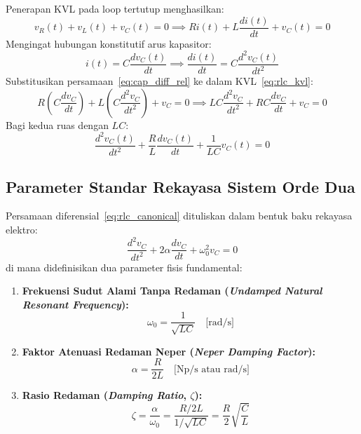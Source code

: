 \documentclass[11pt,a4paper]{article}
\theoremstyle{definition}
\begin{document}
Penerapan KVL pada loop tertutup menghasilkan:
\begin{equation}
    v_R(t) + v_L(t) + v_C(t) = 0 \implies R i(t) + L \frac{di(t)}{dt} + v_C(t) = 0
    \label{eq:rlc_kvl}
\end{equation}
Mengingat hubungan konstitutif arus kapasitor:
\begin{equation}
    i(t) = C \frac{dv_C(t)}{dt} \implies \frac{di(t)}{dt} = C \frac{d^2v_C(t)}{dt^2}
    \label{eq:cap_diff_rel}
\end{equation}
Substitusikan persamaan~\eqref{eq:cap_diff_rel} ke dalam KVL~\eqref{eq:rlc_kvl}:
\begin{equation}
    R \left( C \frac{dv_C}{dt} \right) + L \left( C \frac{d^2v_C}{dt^2} \right) + v_C = 0 \implies L C \frac{d^2v_C}{dt^2} + R C \frac{dv_C}{dt} + v_C = 0
\end{equation}
Bagi kedua ruas dengan $LC$:
\begin{equation}
    \frac{d^2v_C(t)}{dt^2} + \frac{R}{L} \frac{dv_C(t)}{dt} + \frac{1}{LC} v_C(t) = 0
    \label{eq:rlc_canonical}
\end{equation}

\subsection{Parameter Standar Rekayasa Sistem Orde Dua}

Persamaan diferensial~\eqref{eq:rlc_canonical} dituliskan dalam bentuk baku rekayasa elektro:
\begin{equation}
    \frac{d^2v_C}{dt^2} + 2\alpha \frac{dv_C}{dt} + \omega_0^2 v_C = 0
    \label{eq:rlc_standard_eng}
\end{equation}
di mana didefinisikan dua parameter fisis fundamental:
\begin{enumerate}[leftmargin=*]
    \item \textbf{Frekuensi Sudut Alami Tanpa Redaman (\textit{Undamped Natural Resonant Frequency}):}
    \begin{equation}
        \omega_0 = \frac{1}{\sqrt{LC}} \quad \text{[rad/s]}
        \label{eq:omega_zero}
    \end{equation}
    \item \textbf{Faktor Atenuasi Redaman Neper (\textit{Neper Damping Factor}):}
    \begin{equation}
        \alpha = \frac{R}{2L} \quad \text{[Np/s atau rad/s]}
        \label{eq:alpha_rlc}
    \end{equation}
    \item \textbf{Rasio Redaman (\textit{Damping Ratio}, $\zeta$):}
    \begin{equation}
        \zeta = \frac{\alpha}{\omega_0} = \frac{R/2L}{1/\sqrt{LC}} = \frac{R}{2} \sqrt{\frac{C}{L}}
        \label{eq:damping_ratio}
    \end{equation}
\end{enumerate}
\end{document}
